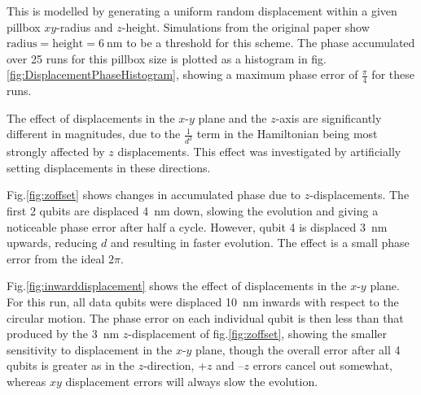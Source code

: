This is modelled by generating a uniform random displacement within a given pillbox $xy$-radius and $z$-height. Simulations from the original paper show $\textrm{radius} = \textrm{height} = \SI{6}{\nano\metre}$ to be a threshold for this scheme. The phase accumulated over 25 runs for this pillbox size is plotted as a histogram in fig.\@ \ref{fig:DisplacementPhaseHistogram}, showing a maximum phase error of $\tfrac{\pi}{4}$ for these runs. 



The effect of displacements in the $x$-$y$ plane and the $z$-axis are significantly different in magnitudes, due to the $\tfrac{1}{d^3}$ term in the Hamiltonian being most strongly affected by $z$ displacements. This effect was investigated by artificially setting displacements in these directions.

Fig.\@ \ref{fig:zoffset} shows changes in accumulated phase due to $z$-displacements. The first 2 qubits are displaced \SI{4}{\nano\metre} down, slowing the evolution and giving a noticeable phase error after half a cycle. However, qubit 4 is displaced \SI{3}{\nano\metre} upwards, reducing $d$ and resulting in faster evolution. The effect is a small phase error from the ideal $2\pi$.

Fig.\@ \ref{fig:inwarddisplacement} shows the effect of displacements in the $x$-$y$ plane. For this run, all data qubits were displaced \SI{10}{\nano\metre} inwards with respect to the circular motion. The phase error on each individual qubit is then less than that produced by the \SI{3}{\nano\metre} $z$-displacement of fig.\@ \ref{fig:zoffset}, showing the smaller sensitivity to displacement in the $x$-$y$ plane, though the overall error after all 4 qubits is greater as in the $z$-direction, +$z$ and --$z$ errors cancel out somewhat, whereas $xy$ displacement errors will always slow the evolution.

